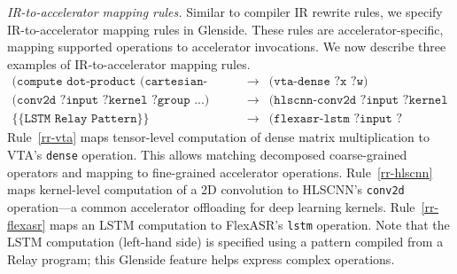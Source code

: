 \textit{IR-to-accelerator mapping rules.}
Similar to compiler IR rewrite rules, we specify IR-to-accelerator mapping 
  rules in Glenside.
These rules are accelerator-specific, mapping supported 
  operations to accelerator invocations.
We now describe three examples of IR-to-accelerator mapping rules.
\scriptsize
\begin{eqnarray}
  \texttt{(compute dot-product (cartesian-product ?x ?w))} &\rightarrow& \texttt{(vta-dense ?x ?w)} \label{rr-vta} \\
  \texttt{(conv2d ?input ?kernel ?group ...)} &\rightarrow& \texttt{(hlscnn-conv2d ?input ?kernel ?group)} \label{rr-hlscnn} \\
  \texttt{\{\{LSTM Relay Pattern\}\}} &\rightarrow& \texttt{(flexasr-lstm ?input ?hidden\_0 ...)} \label{rr-flexasr}
\end{eqnarray}
\normalsize
%
Rule~\ref{rr-vta} maps tensor-level computation of dense matrix multiplication 
  to VTA's \texttt{dense} operation. 
This allows matching decomposed coarse-grained operators and mapping to 
  fine-grained accelerator operations.
Rule~\ref{rr-hlscnn} maps kernel-level computation of a 2D convolution to 
  HLSCNN's \texttt{conv2d} operation---a common accelerator offloading for 
  deep learning kernels.
Rule~\ref{rr-flexasr} maps an LSTM computation to FlexASR's \texttt{lstm} operation.
Note that the LSTM computation (left-hand side) is specified using a pattern 
  compiled from a Relay program; this Glenside feature helps express complex
  operations.

